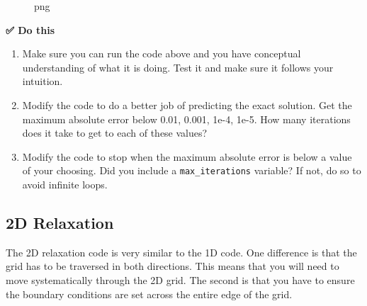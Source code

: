 \begin{figure}
\centering
{}
\caption{png}
\end{figure}

\textbf{✅ Do this}

\begin{enumerate}
\def\labelenumi{\arabic{enumi}.}
\tightlist
\item
  Make sure you can run the code above and you have conceptual
  understanding of what it is doing. Test it and make sure it follows
  your intuition.
\item
  Modify the code to do a better job of predicting the exact solution.
  Get the maximum absolute error below 0.01, 0.001, 1e-4, 1e-5. How many
  iterations does it take to get to each of these values?
\item
  Modify the code to stop when the maximum absolute error is below a
  value of your choosing. Did you include a \texttt{max\_iterations}
  variable? If not, do so to avoid infinite loops.
\end{enumerate}

\subsection{2D Relaxation}\label{d-relaxation}

The 2D relaxation code is very similar to the 1D code. One difference is
that the grid has to be traversed in both directions. This means that
you will need to move systematically through the 2D grid. The second is
that you have to ensure the boundary conditions are set across the
entire edge of the grid.

